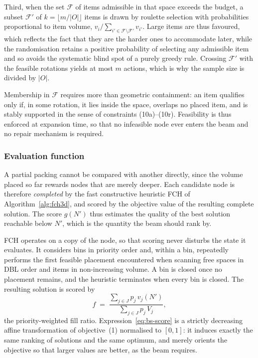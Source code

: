 Third, when the set $\mathcal{F}$ of items admissible in that space exceeds the
budget, a subset $\mathcal{F}'$ of $k = \lfloor m/|O| \rfloor$ items is drawn
by roulette selection with probabilities proportional to item volume,
$v_i / \sum_{i' \in \mathcal{F} \setminus \mathcal{F}'} v_{i'}$. Large items
are thus favoured, which reflects the fact that they are the harder ones to
accommodate later, while the randomisation retains a positive probability of
selecting any admissible item and so avoids the systematic blind spot of a
purely greedy rule. Crossing $\mathcal{F}'$ with the feasible rotations yields
at most $m$ actions, which is why the sample size is divided by $|O|$.

Membership in $\mathcal{F}$ requires more than geometric containment: an item
qualifies only if, in some rotation, it lies inside the space, overlaps no
placed item, and is stably supported in the sense of constraints
(10a)--(10r). Feasibility is thus enforced at expansion time, so that no
infeasible node ever enters the beam and no repair mechanism is required.

\subsubsection{Evaluation function}

A partial packing cannot be compared with another directly, since the volume
placed so far rewards nodes that are merely deeper. Each candidate node is
therefore \emph{completed} by the fast constructive heuristic \textsc{FCH} of
Algorithm~\ref{alg:fch3d}, and scored by the objective value of the resulting
complete solution. The score $g(N')$ thus estimates the quality of the best
solution reachable below $N'$, which is the quantity the beam should rank by.

\textsc{FCH} operates on a copy of the node, so that scoring never disturbs the
state it evaluates. It considers bins in priority order and, within a bin,
repeatedly performs the first feasible placement encountered when scanning free
spaces in DBL order and items in non-increasing volume. A bin is closed once no
placement remains, and the heuristic terminates when every bin is closed. The
resulting solution is scored by
\begin{equation}
f \;=\; \frac{\sum_{j \in J} p_j\, v_j(N')}{\sum_{j \in J} p_j\, V_j},
\label{eq:bs-score}
\end{equation}
the priority-weighted fill ratio. Expression~\eqref{eq:bs-score} is a strictly
decreasing affine transformation of objective~(1) normalised to $[0,1]$: it
induces exactly the same ranking of solutions and the same optimum, and merely
orients the objective so that larger values are better, as the beam requires.

